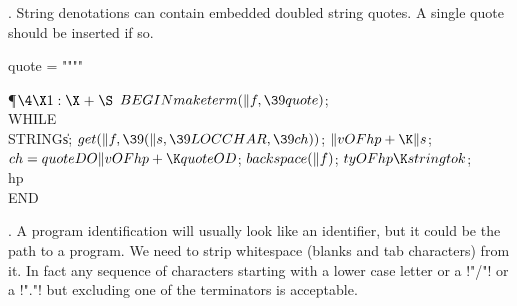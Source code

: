 . String denotations can contain embedded doubled string quotes. A
single quote should be inserted if so.

quote = """"

\Y\P$\4\X1:\X\mathrel{+}\S$\6
$\\{BEGIN}\\{make}\\{term}(\|f,\39\\{quote})$;\5
\\{WHILE}\\{STRING}\|s;\5
$\\{get}(\|f,\39(\|s,\39\\{LOC}\\{CHAR},\39\\{ch}))$;\5
$\|v\\{OF}\\{hp}+\K\|s$;\5
$\\{ch}=\\{quote}\\{DO}\|v\\{OF}\\{hp}+\K\\{quote}\\{OD}$;\5
$\\{backspace}(\|f)$;\5
$\\{ty}\\{OF}\\{hp}\K\\{string}\\{tok}$;\5
\\{hp}\\{END}\par
\fi

. A program identification will usually look like an identifier, but
it could be the path to a program. We need to strip whitespace
(blanks and tab characters) from it. In fact any sequence of
characters starting with a lower case letter or a !"/"! or a !"."!
but excluding one of the terminators is acceptable.

